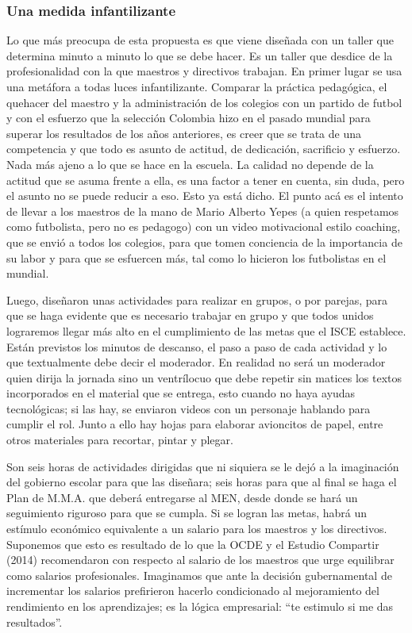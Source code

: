 \documentclass[10pt]{article}
\begin{document}
\subsubsection*{Una medida infantilizante}
Lo que más preocupa de esta propuesta es que viene diseñada con un taller que determina minuto a minuto lo que se debe hacer. Es un taller que desdice de la profesionalidad con la que maestros y directivos trabajan. En primer lugar se usa una metáfora a todas luces infantilizante. Comparar la práctica pedagógica, el quehacer del maestro y la administración de los colegios con un partido de futbol y con el esfuerzo que la selección Colombia hizo en el pasado mundial para superar los resultados de los años anteriores, es creer que se trata de una competencia y que todo es asunto de actitud, de dedicación,
sacrificio y esfuerzo. Nada más ajeno a lo que se hace en la escuela. La calidad no depende de la actitud que se asuma frente a ella, es una factor a tener en cuenta, sin duda, pero el asunto no se puede reducir a eso. Esto ya está dicho. El
punto acá es el intento de llevar a los maestros de la mano de Mario Alberto Yepes (a quien respetamos como futbolista, pero no es pedagogo) con un video motivacional estilo coaching, que se envió a todos los colegios, para que tomen conciencia de la importancia de su labor y para que se esfuercen más, tal como lo hicieron los futbolistas en el mundial.

Luego, diseñaron unas actividades para realizar en grupos, o por parejas, para que se haga evidente que es necesario trabajar en grupo y que todos unidos lograremos llegar más alto en el cumplimiento de las metas que el ISCE establece.
Están previstos los minutos de descanso, el paso a paso de cada actividad y lo que textualmente debe decir el moderador. En realidad no será un moderador quien dirija la jornada sino un ventrílocuo que debe repetir sin matices los textos
incorporados en el material que se entrega, esto cuando no haya ayudas tecnológicas; si las hay, se enviaron videos con un personaje hablando para cumplir el rol. Junto a ello hay hojas para elaborar avioncitos de papel, entre otros materiales para recortar, pintar y plegar.

Son seis horas de actividades dirigidas que ni siquiera se le dejó a la imaginación del gobierno escolar para que las diseñara; seis horas para que al final se haga el Plan de M.M.A. que deberá entregarse al MEN, desde donde se hará un
seguimiento riguroso para que se cumpla. Si se logran las metas, habrá un estímulo económico equivalente a un salario para los maestros y los directivos. Suponemos que esto es resultado de lo que la OCDE y el Estudio Compartir (2014) recomendaron con respecto al salario de los maestros que urge equilibrar como salarios profesionales. Imaginamos que ante la decisión gubernamental de incrementar los salarios prefirieron hacerlo condicionado al mejoramiento del rendimiento en los aprendizajes; es la lógica empresarial: “te estimulo si me das
resultados”.
\end{document}
